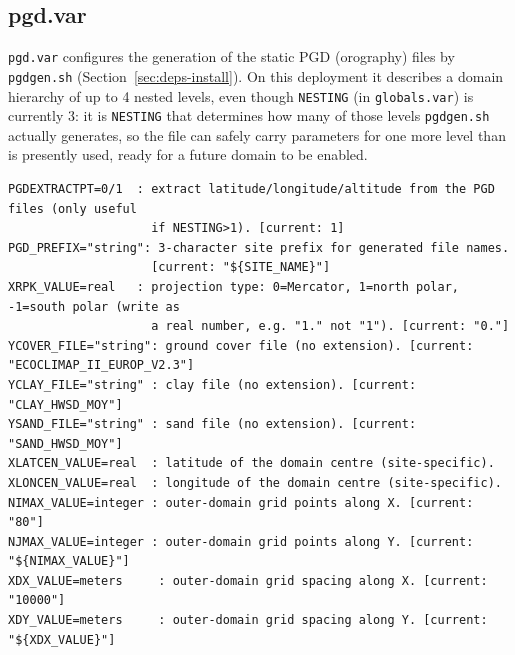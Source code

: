 \subsection{pgd.var}
\texttt{pgd.var} configures the generation of the static PGD (orography) files by \texttt{pgdgen.sh}
(Section~\ref{sec:deps-install}). On this deployment it describes a domain hierarchy of up to 4 nested
levels, even though \texttt{NESTING} (in \texttt{globals.var}) is currently 3: it is \texttt{NESTING}
that determines how many of those levels \texttt{pgdgen.sh} actually generates, so the file can safely
carry parameters for one more level than is presently used, ready for a future domain to be enabled.

\begin{lstlisting}
PGDEXTRACTPT=0/1  : extract latitude/longitude/altitude from the PGD files (only useful
                    if NESTING>1). [current: 1]
PGD_PREFIX="string": 3-character site prefix for generated file names.
                    [current: "${SITE_NAME}"]
XRPK_VALUE=real   : projection type: 0=Mercator, 1=north polar, -1=south polar (write as
                    a real number, e.g. "1." not "1"). [current: "0."]
YCOVER_FILE="string": ground cover file (no extension). [current: "ECOCLIMAP_II_EUROP_V2.3"]
YCLAY_FILE="string" : clay file (no extension). [current: "CLAY_HWSD_MOY"]
YSAND_FILE="string" : sand file (no extension). [current: "SAND_HWSD_MOY"]
XLATCEN_VALUE=real  : latitude of the domain centre (site-specific).
XLONCEN_VALUE=real  : longitude of the domain centre (site-specific).
NIMAX_VALUE=integer : outer-domain grid points along X. [current: "80"]
NJMAX_VALUE=integer : outer-domain grid points along Y. [current: "${NIMAX_VALUE}"]
XDX_VALUE=meters     : outer-domain grid spacing along X. [current: "10000"]
XDY_VALUE=meters     : outer-domain grid spacing along Y. [current: "${XDX_VALUE}"]
\end{lstlisting}

